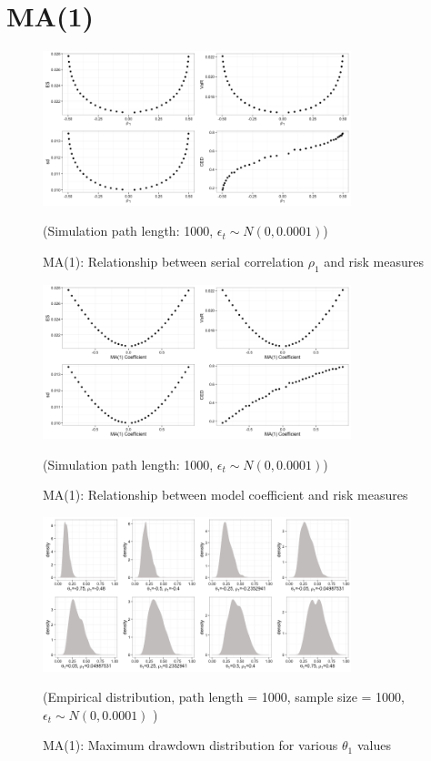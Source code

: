 \documentclass[11pt]{article}
\begin{document}
\section{MA(1)} %

\begin{figure}[H]
\centering
\includegraphics[width = 0.8\textwidth]{../figures/simulation/MA1_risk_measures_acf1}
\caption{MA(1): Relationship between serial correlation $\rho_1$ and risk measures}
(Simulation path length: 1000, $\epsilon_t \sim N(0, 0.0001)$)
\label{fig:MA1_risk_measures_acf1}
\end{figure}

\begin{figure}[H]
\centering
\includegraphics[width = 0.8\textwidth]{../figures/simulation/MA1_risk_measures_coefficient}
\caption{MA(1): Relationship between model coefficient and risk measures}
(Simulation path length: 1000, $\epsilon_t \sim N(0, 0.0001)$)
\label{fig:MA1_risk_measures_coefficient}
\end{figure}

\begin{figure}[H]
\centering
\includegraphics[width = 0.8\textwidth]{../figures/simulation/MA1_maxDrawdown_dist}
\caption{MA(1): Maximum drawdown distribution for various $\theta_1$ values}
(Empirical distribution, path length = 1000, sample size = 1000, $\epsilon_t \sim N(0, 0.0001)$ )
\label{fig:MA1_maxDrawdown_dist}
\end{figure}
\end{document}

